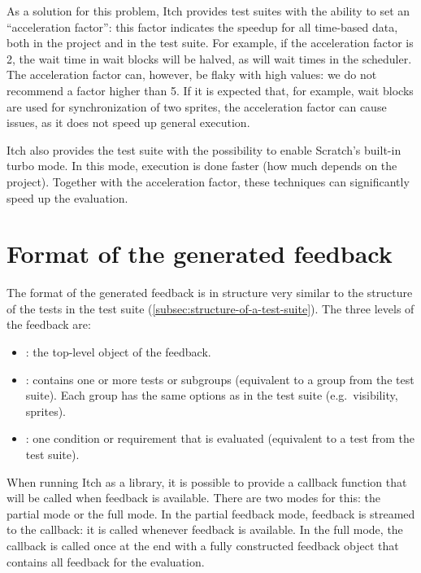 \documentclass[../main]{subfiles}
\begin{document}
As a solution for this problem, Itch provides test suites with the ability to set an ``acceleration factor'': this factor indicates the speedup for all time-based data, both in the project and in the test suite.
For example, if the acceleration factor is 2, the wait time in wait blocks will be halved, as will wait times in the scheduler.
The acceleration factor can, however, be flaky with high values: we do not recommend a factor higher than 5.
If it is expected that, for example, wait blocks are used for synchronization of two sprites, the acceleration factor can cause issues, as it does not speed up general execution.

Itch also provides the test suite with the possibility to enable Scratch's built-in turbo mode.
In this mode, execution is done faster (how much depends on the project).
Together with the acceleration factor, these techniques can significantly speed up the evaluation.

\section{Format of the generated feedback}\label{sec:format-of-the-generated-feedback}

The format of the generated feedback is in structure very similar to the structure of the tests in the test suite (\cref{subsec:structure-of-a-test-suite}).
The three levels of the feedback are:

\begin{itemize}[nosep]
    \item {}: the top-level object of the feedback.
    \item {}: contains one or more tests or subgroups (equivalent to a group from the test suite).
        Each group has the same options as in the test suite (e.g.\ visibility, sprites).
    \item {}: one condition or requirement that is evaluated (equivalent to a test from the test suite).
\end{itemize}

When running Itch as a library, it is possible to provide a callback function that will be called when feedback is available.
There are two modes for this: the partial mode or the full mode.
In the partial feedback mode, feedback is streamed to the callback: it is called whenever feedback is available.
In the full mode, the callback is called once at the end with a fully constructed feedback object that contains all feedback for the evaluation.
\end{document}
